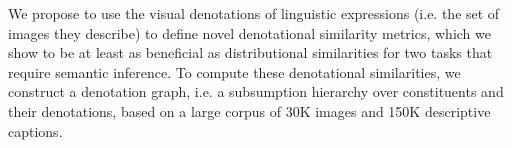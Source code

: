 We propose to use the visual denotations of linguistic expressions (i.e. the set of images they describe) to define novel denotational similarity metrics, which we show to be at least as beneficial as distributional similarities for two tasks that require semantic inference. To compute these denotational similarities, we construct a denotation graph, i.e. a subsumption hierarchy over constituents and their denotations, based on a large corpus of 30K images and 150K descriptive captions.
